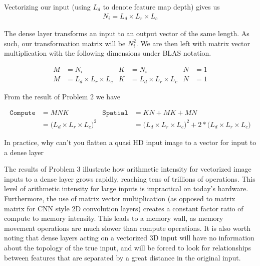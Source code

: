 \documentclass[11pt]{article}
\begin{document}
Vectorizing our input (using $L_d$ to denote feature map depth) gives us
\begin{align}
	N_i = L_d \times L_r \times L_c
\end{align}

The dense layer transforms an input to an output vector of the same length. As
such, our transformation matrix will be $N_i^2$. We are then left with matrix
vector multiplication with the following dimensions under BLAS notation.

\begin{align}
	M&=N_i & K&=N_i & N&=1 \\
	M&=L_d \times L_r \times L_c & K&=L_d \times L_r \times L_c & N&=1
\end{align}

From the result of Problem 2 we have

\begin{align}
	\texttt{Compute} &= M N K &
		\texttt{Spatial} &= KN + MK + MN \\
	&= \big(L_d \times L_r \times L_c\big)^2 &
		&= \big(L_d \times L_r \times L_c\big)^2 +  2* \big(L_d \times L_r \times L_c\big)
\end{align}

In practice, why can't you flatten a quasi HD input image to a vector for input
to a dense layer

\begin{solution}

	The results of Problem 3 illustrate how arithmetic intensity for vectorized
	image inputs to a dense layer grows rapidly, reaching tens of trillions of
	operations. This level of arithmetic intensity for large inputs is
	impractical on today's hardware. Furthermore, the use of matrix
	vector multiplication (as opposed to matrix matrix for CNN style 2D
	convolution layers) creates a constant factor ratio of compute to memory
	intensity. This leads to a memory wall, as memory movement operations are
	much slower than compute operations. It is also worth noting that dense
	layers acting on a vectorized 3D input will have no information about the
	topology of the true input, and will be forced to look for relationships
	between features that are separated by a great distance in the original
	input.
\end{solution}
\end{document}
